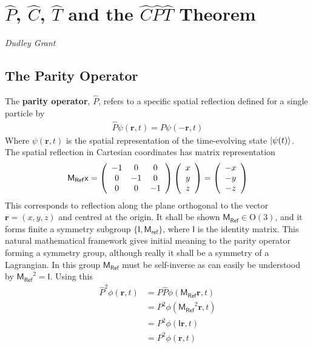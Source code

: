 \section{$\hat{P}$, $\hat{C}$, $\hat{T}$ and the $\hat{C}\hat{P}\hat{T}$ Theorem}
\vspace{-1.0em}
\begin{center}
\tiny{\textit{Dudley Grant}}
\end{center}

\subsection{The Parity Operator}

The \textbf{parity operator}, $\hat{P}$, refers to a specific spatial reflection defined for a single particle by
\begin{align*}
\hat{P}\psi(\mathbf{r},t) = P\psi(-\mathbf{r},t) 
\end{align*}
Where $\psi(\mathbf{r},t)$ is the spatial representation of the time-evolving state $\ket{\psi(t)}$. The spatial reflection in Cartesian coordinates has matrix representation
\begin{align*}
\mathsf{M_{Ref}}\mathsf{x}=\left( \begin{array}{c c c} -1 & 0 &0 \\
0& -1&0 \\
0&0&-1 \end{array}\right)\left( \begin{array}{c} x\\y\\z \end{array} \right) = \left( \begin{array}{c} -x\\-y\\-z \end{array} \right)
\end{align*}
This corresponds to reflection along the plane orthogonal to the vector $\mathbf{r}=(x,y,z)$ and centred at the origin. It shall be shown $\mathsf{M_{Ref}}  \in \mathrm{O}(3)$, and it forms finite a symmetry subgroup $\{\mathsf{I},\mathsf{M_{ref}} \}$, where $\mathsf{I}$ is the identity matrix. This natural mathematical framework gives initial meaning to the parity operator forming a symmetry group, although really it shall be a symmetry of a Lagrangian. In this group $\mathsf{M_{Ref}}$ must be self-inverse as can easily be understood by $\mathsf{M_{Ref}}^2=\mathsf{I}$. Using this
\begin{align*}
\hat{P}^2\phi(\mathbf{r},t)&=P\hat{P}\phi(\mathsf{M_{Ref}}\mathbf{r},t)\\
&= P^2\phi(\mathsf{M_{Ref}}^2\mathbf{r},t)\\
&= P^2\phi(\mathsf{I}\mathbf{r},t)\\
&= P^2\phi(\mathbf{r},t)
\end{align*}

